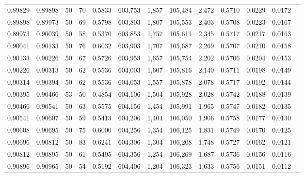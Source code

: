 \begin{tabular}{rrrrrrrrrrrrr}
0.89829 & 0.89898 &    50 &  70 &                                     0.5833 & 603,753 &   1,857 & 105,484 &   2,472 & 0.5710 & 0.0229 & 0.0172 \\
0.89898 & 0.89973 &    50 &  69 &                                     0.5798 & 603,803 &   1,807 & 105,553 &   2,403 & 0.5708 & 0.0223 & 0.0167 \\
0.89973 & 0.90039 &    50 &  58 &                                     0.5370 & 603,853 &   1,757 & 105,611 &   2,345 & 0.5717 & 0.0217 & 0.0163 \\
0.90041 & 0.90133 &    50 &  76 &                                     0.6032 & 603,903 &   1,707 & 105,687 &   2,269 & 0.5707 & 0.0210 & 0.0158 \\
0.90133 & 0.90226 &    50 &  67 &                                     0.5726 & 603,953 &   1,657 & 105,754 &   2,202 & 0.5706 & 0.0204 & 0.0153 \\
0.90226 & 0.90313 &    50 &  62 &                                     0.5536 & 604,003 &   1,607 & 105,816 &   2,140 & 0.5711 & 0.0198 & 0.0149 \\
0.90314 & 0.90394 &    50 &  62 &                                     0.5536 & 604,053 &   1,557 & 105,878 &   2,078 & 0.5717 & 0.0192 & 0.0144 \\
0.90395 & 0.90466 &    53 &  50 &                                     0.4854 & 604,106 &   1,504 & 105,928 &   2,028 & 0.5742 & 0.0188 & 0.0139 \\
0.90466 & 0.90541 &    50 &  63 &                                     0.5575 & 604,156 &   1,454 & 105,991 &   1,965 & 0.5747 & 0.0182 & 0.0135 \\
0.90541 & 0.90607 &    50 &  59 &                                     0.5413 & 604,206 &   1,404 & 106,050 &   1,906 & 0.5758 & 0.0177 & 0.0130 \\
0.90608 & 0.90695 &    50 &  75 &                                     0.6000 & 604,256 &   1,354 & 106,125 &   1,831 & 0.5749 & 0.0170 & 0.0125 \\
0.90696 & 0.90812 &    50 &  83 &                                     0.6241 & 604,306 &   1,304 & 106,208 &   1,748 & 0.5727 & 0.0162 & 0.0121 \\
0.90812 & 0.90895 &    50 &  61 &                                     0.5495 & 604,356 &   1,254 & 106,269 &   1,687 & 0.5736 & 0.0156 & 0.0116 \\
0.90896 & 0.90965 &    50 &  54 &                                     0.5192 & 604,406 &   1,204 & 106,323 &   1,633 & 0.5756 & 0.0151 & 0.0112 \\

\end{tabular}
